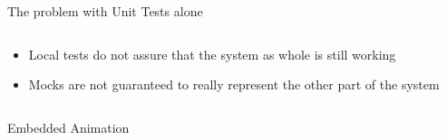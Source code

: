 \begin{frame}{The problem with Unit Tests alone}
  \begin{columns}
    \begin{column}{0.5\textwidth}
      \begin{itemize}
        \item Local tests do not assure that the system as whole is still working
        \item Mocks are not guaranteed to really represent the other part of the system
      \end{itemize}
    \end{column}
    \begin{column}{0.5\textwidth}
      \begin{center}
      \end{center}
    \end{column}
    \end{columns}
\end{frame}

\begin{frame}{Embedded Animation}
  \begin{center}
  \end{center}
\end{frame}

